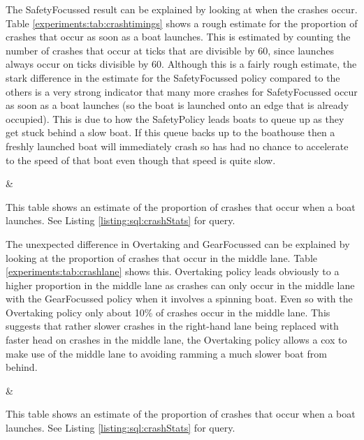   The SafetyFocussed result can be explained by looking at when the crashes occur. Table \ref{experiments:tab:crashtimings} shows a rough estimate for the proportion of crashes that occur as soon as a boat launches. This is estimated by counting the number of crashes that occur at ticks that are divisible by 60, since launches always occur on ticks divisible by 60. Although this is a fairly rough estimate, the stark difference in the estimate for the SafetyFocussed policy compared to the others is a very strong indicator that many more crashes for SafetyFocussed occur as soon as a boat launches (so the boat is launched onto an edge that is already occupied). This is due to how the SafetyPolicy leads boats to queue up as they get stuck behind a slow boat. If this queue backs up to the boathouse then a freshly launched boat will immediately crash so has had no chance to accelerate to the speed of that boat even though that speed is quite slow.

  \begin{table}[h]
  \centering
  {\cp & \crashes }
  \caption{This table shows an estimate of the proportion of crashes that occur when a boat launches. See Listing \ref{listing:sql:crashStats} for query.}
  \label{experiments:tab:crashtimings}
  \end{table}
  
  The unexpected difference in Overtaking and GearFocussed can be explained by looking at the proportion of crashes that occur in the middle lane. Table \ref{experiments:tab:crashlane} shows this. Overtaking policy leads obviously to a higher proportion in the middle lane as crashes can only occur in the middle lane with the GearFocussed policy when it involves a spinning boat. Even so with the Overtaking policy only about 10\% of crashes occur in the middle lane. This suggests that rather slower crashes in the right-hand lane being replaced with faster head on crashes in the middle lane, the Overtaking policy allows a cox to make use of the middle lane to avoiding ramming a much slower boat from behind.
  
  \begin{table}[h]
  \centering
  {\cp & \middle }
  \caption{This table shows an estimate of the proportion of crashes that occur when a boat launches. See Listing \ref{listing:sql:crashStats} for query.}
  \label{experiments:tab:crashlane}
  \end{table}
  
